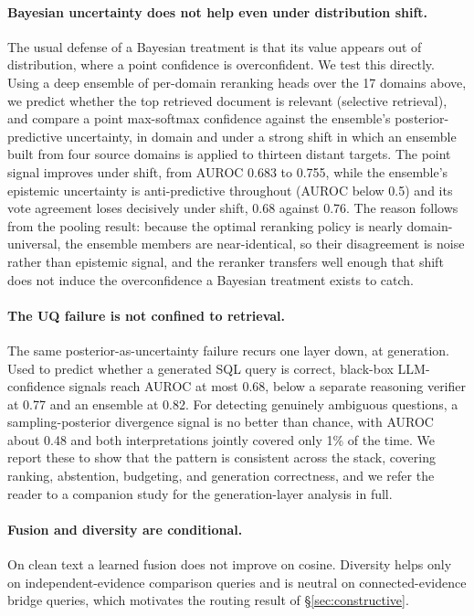 \documentclass[11pt]{article}
\begin{document}
\paragraph{Bayesian uncertainty does not help even under distribution shift.} The usual defense of a
Bayesian treatment is that its value appears out of distribution, where a point confidence is
overconfident. We test this directly. Using a deep ensemble of per-domain reranking heads over the 17
domains above, we predict whether the top retrieved document is relevant (selective retrieval), and
compare a point max-softmax confidence against the ensemble's posterior-predictive uncertainty, in
domain and under a strong shift in which an ensemble built from four source domains is applied to
thirteen distant targets. The point signal improves under shift, from AUROC 0.683 to 0.755, while the
ensemble's epistemic uncertainty is anti-predictive throughout (AUROC below 0.5) and its vote agreement
loses decisively under shift, 0.68 against 0.76. The reason follows from the pooling result: because the
optimal reranking policy is nearly domain-universal, the ensemble members are near-identical, so their
disagreement is noise rather than epistemic signal, and the reranker transfers well enough that shift
does not induce the overconfidence a Bayesian treatment exists to catch.

\paragraph{The UQ failure is not confined to retrieval.} The same posterior-as-uncertainty failure
recurs one layer down, at generation. Used to predict whether a generated SQL query is correct,
black-box LLM-confidence signals reach AUROC at most 0.68, below a separate reasoning verifier at 0.77
and an ensemble at 0.82. For detecting genuinely ambiguous questions, a sampling-posterior divergence
signal is no better than chance, with AUROC about 0.48 and both interpretations jointly covered only
1\% of the time. We report these to show that the pattern is consistent across the stack, covering
ranking, abstention, budgeting, and generation correctness, and we refer the reader to a companion
study for the generation-layer analysis in full.

\paragraph{Fusion and diversity are conditional.} On clean text a learned fusion does not improve on
cosine. Diversity helps only on independent-evidence comparison queries and is neutral on
connected-evidence bridge queries, which motivates the routing result of \S\ref{sec:constructive}.
\end{document}
